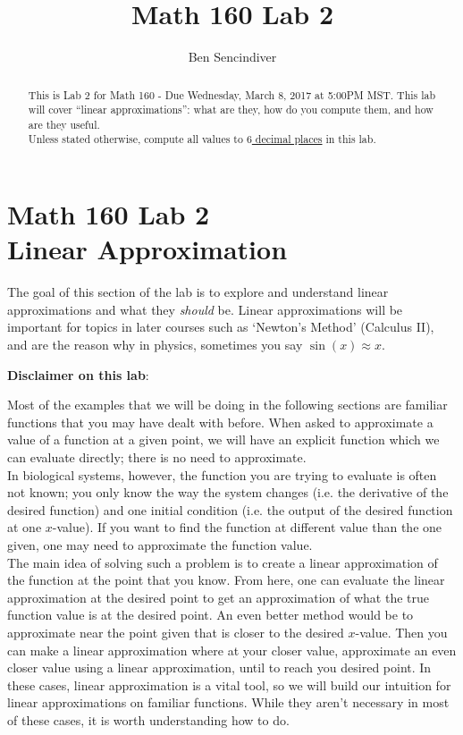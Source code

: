 \documentclass[handout,nooutcomes]{ximera}
\title{Math 160 Lab 2}
\author{Ben Sencindiver} %
\begin{document}
\section{Math 160 Lab 2 \\ Linear Approximation}

\begin{abstract}
This is Lab 2 for Math 160 - Due Wednesday, March 8, 2017 at 5:00PM MST.
This lab will cover ``linear approximations'': what are they,
how do you compute them, and how are they useful. \\

Unless stated otherwise, compute all values to \underline{$6$ decimal places} in this lab.
\end{abstract}



\maketitle



The goal of this section of the lab is to explore and understand linear
approximations and what they {\it should} be. Linear approximations will
be important for topics in later courses such as `Newton's Method' (Calculus II),
and are the reason why in physics, sometimes you say $\sin(x)\approx x$.

\textbf{Disclaimer on this lab}:

Most of the examples that we will be doing in the following sections
are familiar functions that you may have dealt with before. 
When asked to approximate a value of a function at a given point, 
we will have an explicit function which we can evaluate directly; there
is no need to approximate. \\

In biological systems, however, the function you are trying to evaluate
is often not known; you only know the way the system changes 
(i.e. the derivative of the desired function) and one initial condition
(i.e. the output of the desired function at one $x$-value). If you want
to find the function at different value than the one given,
one may need to approximate the function value.\\

The main idea of solving such a problem is to create a 
linear approximation of the function at the point that you know. From here,
one can evaluate the linear approximation at the desired point to get an
approximation of what the true function value is at the desired point. 
An even better method would be to approximate near the point given that
is closer to the desired $x$-value. Then you can make a linear approximation
where at your closer value, approximate an even closer value using a linear
approximation, until to reach you desired point. In these cases, linear
approximation is a vital tool, so we will build our intuition for linear
approximations on familiar functions. While they aren't necessary in most
of these cases, it is worth understanding how to do.\\
\end{document}
